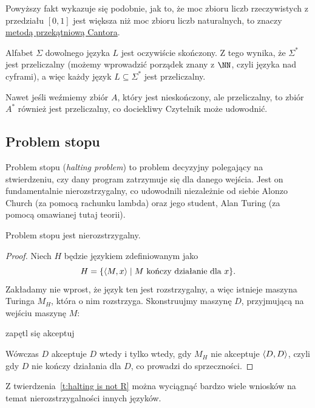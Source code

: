 Powyższy fakt wykazuje się podobnie, jak to, że moc zbioru liczb rzeczywistych z przedziału $[0, 1]$ jest większa niż moc zbioru liczb naturalnych, to znaczy \href{https://pl.wikipedia.org/wiki/Metoda_przekątniowa}{metodą przekątniową Cantora}.

\begin{remark}
    Alfabet $\Sigma$ dowolnego języka $L$ jest oczywiście skończony. Z tego wynika, że $\Sigma^*$ jest przeliczalny (możemy wprowadzić porządek znany z $\NN$, czyli języka nad cyframi), a więc każdy język $L \subseteq \Sigma^*$ jest przeliczalny.

    Nawet jeśli weźmiemy zbiór $A$, który jest nieskończony, ale przeliczalny, to zbiór $A^*$ również jest przeliczalny, co dociekliwy Czytelnik może udowodnić.
\end{remark}

\subsection{Problem stopu}
Problem stopu (\textit{halting problem}) to problem decyzyjny polegający na stwierdzeniu, czy dany program zatrzymuje się dla danego wejścia. Jest on fundamentalnie nierozstrzygalny, co udowodnili niezależnie od siebie Alonzo Church (za pomocą rachunku lambda) oraz jego student, Alan Turing (za pomocą omawianej tutaj teorii).

\begin{theorem}\label{t:halting is not R}
    Problem stopu jest nierozstrzygalny.
\end{theorem}
\begin{proof}
    Niech $H$ będzie językiem zdefiniowanym jako
    \[ H = \{\left\langle M, x \right\rangle \mid M \text{ kończy działanie dla } x\}. \]
    Zakładamy nie wprost, że język ten jest rozstrzygalny, a więc istnieje maszyna Turinga $M_H$, która o nim rozstrzyga. Skonstruujmy maszynę $D$, przyjmującą na wejściu maszynę $M$:
    \begin{algorithmic}
            \State zapętl się
        \Else
            \State akceptuj
        \EndIf
    \end{algorithmic}
    Wówczas $D$ akceptuje $D$ wtedy i tylko wtedy, gdy $M_H$ nie akceptuje $\left\langle D, D \right\rangle$, czyli gdy $D$ nie kończy działania dla $D$, co prowadzi do sprzeczności.
\end{proof}

Z twierdzenia~\ref{t:halting is not R} można wyciągnąć bardzo wiele wniosków na temat nierozstrzygalności innych języków.

